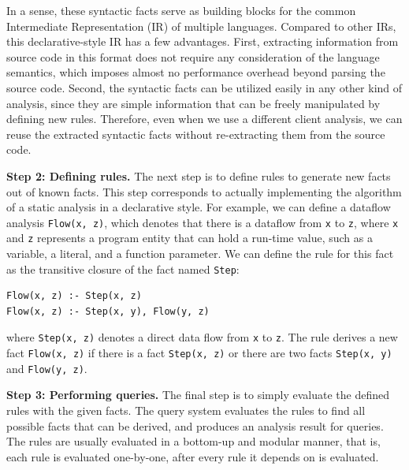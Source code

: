 In a sense, these syntactic facts serve as building blocks for the
common Intermediate Representation (IR) of multiple languages.
Compared to other IRs, this declarative-style IR has a few advantages.
First, extracting information from source code in this format does not
require any consideration of the language semantics, which imposes
almost no performance overhead beyond parsing the source code.
Second, the syntactic facts can be utilized easily in any other kind of
analysis, since they are simple information that can be freely
manipulated by defining new rules. Therefore, even when we use a different
client analysis, we can reuse the extracted syntactic facts
without re-extracting them from the source code.

\textbf{Step 2: Defining rules.}
The next step is to define rules to generate new facts out of known facts.
This step corresponds to actually implementing the algorithm of a static
analysis in a declarative style.  For example, we can define a dataflow
analysis {\tt Flow(x, z)},  which denotes that there is a dataflow from {\tt x}
to {\tt z}, where {\tt x} and {\tt z} represents a program entity that can hold
a run-time value, such as a variable, a literal, and a function parameter.  We
can define the rule for this fact as the transitive closure of the fact named
{\tt Step}:

\begin{lstlisting}
Flow(x, z) :- Step(x, z)
Flow(x, z) :- Step(x, y), Flow(y, z)
\end{lstlisting}

\noindent
where {\tt Step(x, z)} denotes a direct data flow from {\tt x} to {\tt z}. The
rule derives a new fact {\tt Flow(x, z)} if there is a fact {\tt Step(x, z)} or
there are two facts {\tt Step(x, y)} and {\tt Flow(y, z)}.


\textbf{Step 3: Performing queries.}
The final step is to simply evaluate the defined rules with the given facts.
The query system evaluates the rules to find all possible facts that can be
derived, and produces an analysis result for queries. The rules are usually
evaluated in a bottom-up and modular manner, that is, each rule is evaluated
one-by-one, after every rule it depends on is evaluated.


